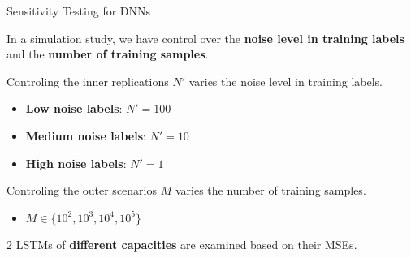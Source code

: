 \documentclass[9pt,handout]{beamer}
\begin{document}
\begin{frame}{Sensitivity Testing for DNNs}

    In a simulation study, we have control over the \textbf{noise level in training labels} and the \textbf{number of training samples}.

    \vspace{10pt}
    
    Controling the inner replications $N'$ varies the noise level in training labels.

    \begin{itemize}
        \item   \textbf{Low noise labels}: $N' = 100$
        \item   \textbf{Medium noise labels}: $N' = 10$
        \item   \textbf{High noise labels}: $N' = 1$
    \end{itemize}

    \vspace{10pt}

    Controling the outer scenarios $M$ varies the number of training samples.

    \begin{itemize}
        \item $M \in \{10^2, 10^3, 10^4, 10^5\}$
    \end{itemize}

    \vspace{10pt}

    2 LSTMs of \textbf{different capacities} are examined based on their MSEs.


\end{frame}
\end{document}
